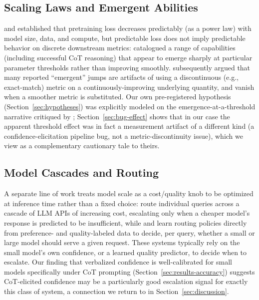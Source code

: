 \documentclass{article}
\begin{document}
\subsection{Scaling Laws and Emergent Abilities}

\citet{kaplan2020scaling} and \citet{hoffmann2022chinchilla} established that pretraining loss decreases predictably (as a power law) with model size, data, and compute, but predictable loss does not imply predictable behavior on discrete downstream metrics: \citet{wei2022emergent} catalogued a range of capabilities (including successful CoT reasoning) that appear to emerge sharply at particular parameter thresholds rather than improving smoothly. \citet{schaeffer2023mirage} subsequently argued that many reported ``emergent'' jumps are artifacts of using a discontinuous (e.g., exact-match) metric on a continuously-improving underlying quantity, and vanish when a smoother metric is substituted. Our own pre-registered hypothesis (Section~\ref{sec:hypotheses}) was explicitly modeled on the emergence-at-a-threshold narrative critiqued by \citet{schaeffer2023mirage}; Section~\ref{sec:bug-effect} shows that in our case the apparent threshold effect was in fact a measurement artifact of a different kind (a confidence-elicitation pipeline bug, not a metric-discontinuity issue), which we view as a complementary cautionary tale to theirs.

\subsection{Model Cascades and Routing}

A separate line of work treats model scale as a cost/quality knob to be optimized at inference time rather than a fixed choice: \citet{chen2023frugalgpt} route individual queries across a cascade of LLM APIs of increasing cost, escalating only when a cheaper model's response is predicted to be insufficient, while \citet{ong2024routellm} and \citet{ding2024hybridllm} learn routing policies directly from preference- and quality-labeled data to decide, per query, whether a small or large model should serve a given request. These systems typically rely on the small model's own confidence, or a learned quality predictor, to decide when to escalate. Our finding that verbalized confidence is well-calibrated for small models specifically under CoT prompting (Section~\ref{sec:results-accuracy}) suggests CoT-elicited confidence may be a particularly good escalation signal for exactly this class of system, a connection we return to in Section~\ref{sec:discussion}.
\end{document}
